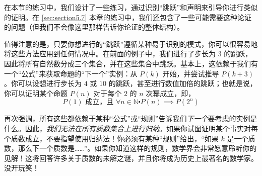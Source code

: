 在本节的练习中，我们设计了一些练习，通过识别``跳跃''和声明来引导你进行类似的证明。在 \ref{sec:section5.7} 本章的练习中，我们还包含了一些可能需要这种论证的问题（但我们不会像这里那样告诉你论证的整体结构）。

值得注意的是，只要你想进行的``跳跃''遵循某种易于识别的模式，你可以很容易地将这些方法应用到任何情况中。在前面的例子中，我们进行了步长为 $3$ 的跳跃，因此将所有自然数分成三个集合，并在这些集合中跳跃。基本上，这依赖于我们有一个``公式''来获取命题的``下一个''实例：从 $P(k)$ 开始，并尝试推导 $P(k + 3)$。你可以设想进行步长为 $4$ 或 $10$ 的跳跃，甚至进行数值加倍的跳跃；也就是说，你可以证明某个命题 $P(n)$ 对于每个 $2$ 的 $n$ 次幂成立，即，
\[P(1) \text{ 成立，且 } \forall n \in \mathbb{N} \centerdot P(n) \implies P(2^n)\]

再次强调，所有这些都依赖于某种``公式''或``规则''告诉我们\emph{下一个}要考虑的实例是什么。因此，\emph{我们无法在所有质数集合上进行归纳}。如果你试图证明某个事实对每个质数成立，不要指望使用归纳法！你必须有某种``规则''给出，``如果 $k$ 是一个质数，那么下一个质数是……''。如果你知道这样的规则，数学界会非常愿意聆听你的见解！这将回答许多关于质数的未解之谜，并且你将成为历史上最著名的数学家。没开玩笑！

